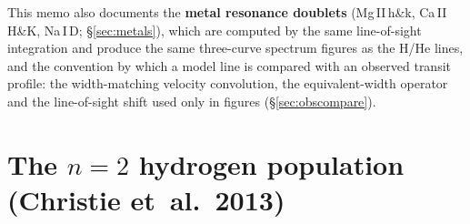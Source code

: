 \documentclass[english,a4paper]{my_memo}
\begin{document}
This memo also documents the \textbf{metal resonance doublets}
(Mg\,II\,h\&k, Ca\,II\,H\&K, Na\,I\,D; \S\ref{sec:metals}), which are
computed by the same line-of-sight integration and produce the same three-curve
spectrum figures as the H/He lines, and the convention by which a model line
is compared with an observed transit profile: the width-matching velocity
convolution, the equivalent-width operator and the line-of-sight shift used
only in figures (\S\ref{sec:obscompare}).

\section{The $n=2$ hydrogen population (Christie et~al.~2013)}
\end{document}
